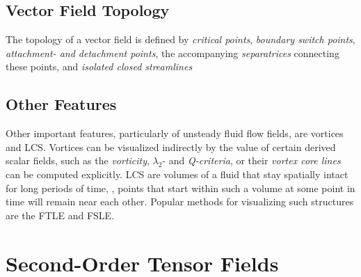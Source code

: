 %
%
\subsection{Vector Field Topology} %
\label{sub:vector_field_topology}
%
The topology of a vector field is defined by \emph{critical points},
\emph{boundary switch points}, \emph{attachment- and detachment points}, the
accompanying \emph{separatrices} connecting these points, and \emph{isolated
closed streamlines}
%

%
%
\subsection{Other Features} %
\label{sub:other_features}
%
Other important features, particularly of unsteady fluid flow fields, are
vortices and \ac{LCS}.
%
Vortices can be visualized indirectly by the value of certain derived scalar
fields, such as the \emph{vorticity}, \emph{$\lambda_2$}- and
\emph{Q-criteria}, or their \emph{vortex core lines} can be computed explicitly.
%
\ac{LCS} are volumes of a fluid that stay spatially intact for long periods of
time, \eg, points that start within such a volume at some point in time will
remain near each other.
%
Popular methods for visualizing such structures are the \ac{FTLE} and
\ac{FSLE}.
%

%
%
%
%
%
%
%

\section{Second-Order Tensor Fields} %
\label{sec:tensor_fields}


